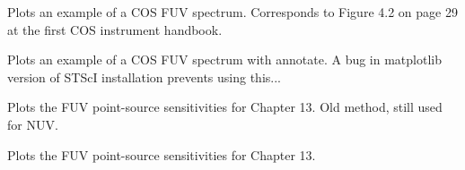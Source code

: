 \documentclass[letterpaper,10pt,english]{sphinxmanual}
\begin{document}
\begin{fulllineitems}
\begin{fulllineitems}
\end{fulllineitems}



\begin{fulllineitems}
\label{SamPy.plot.COSIHB:SamPy.plot.COSIHB.plotting.Plotting.COSFUVSpectrum}
Plots an example of a COS FUV spectrum.
Corresponds to Figure 4.2 on page 29 at the first COS instrument handbook.

\end{fulllineitems}



\begin{fulllineitems}
\label{SamPy.plot.COSIHB:SamPy.plot.COSIHB.plotting.Plotting.COSFUVSpectrumDev2}
Plots an example of a COS FUV spectrum with annotate.
A bug in matplotlib version of STScI installation prevents using this...

\end{fulllineitems}



\begin{fulllineitems}
\label{SamPy.plot.COSIHB:SamPy.plot.COSIHB.plotting.Plotting.Chapeter13Plots}
Plots the FUV point-source sensitivities for Chapter 13. Old method, still used for NUV.

\end{fulllineitems}



\begin{fulllineitems}
\label{SamPy.plot.COSIHB:SamPy.plot.COSIHB.plotting.Plotting.Chapeter13Sensitivity}
Plots the FUV point-source sensitivities for Chapter 13.


\end{fulllineitems}
\end{fulllineitems}
\end{document}
